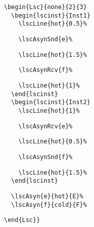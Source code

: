 \documentclass{article}
\begin{document}
\begin{center}%
\begin{minipage}{0.45\textwidth}%
\end{minipage}%
\hfill%
\begin{minipage}{0.33\textwidth}%
\small%
{\gray\begin{verbatim}
\begin{Lsc}{none}{2}{3}
  \begin{lscinst}{Inst1}
    \lscLine{hot}{0.5}%
\end{verbatim}}%
\verbunskip%
{\begin{verbatim}
    \lscAsynSnd{e}%
\end{verbatim}}%
\verbunskip%
{\gray\begin{verbatim}
    \lscLine{hot}{1.5}%
\end{verbatim}}%
\verbunskip%
{\begin{verbatim}
    \lscAsynRcv{f}%
\end{verbatim}}%
\verbunskip%
{\gray\begin{verbatim}
    \lscLine{hot}{1}%
  \end{lscinst}
  \begin{lscinst}{Inst2}
    \lscLine{hot}{1}%
\end{verbatim}}%
\verbunskip%
{\begin{verbatim}
    \lscAsynRcv{e}%
\end{verbatim}}%
\verbunskip%
{\gray\begin{verbatim}
    \lscLine{hot}{0.5}%
\end{verbatim}}%
\verbunskip%
{\begin{verbatim}
    \lscAsynSnd{f}%
\end{verbatim}}%
\verbunskip%
{\gray\begin{verbatim}
    \lscLine{hot}{1.5}%
  \end{lscinst}
\end{verbatim}}%
\verbunskip%
{\begin{verbatim}
  \lscAsyn{e}{hot}{E}%
  \lscAsyn{f}{cold}{F}%
\end{verbatim}}%
\verbunskip%
{\gray\begin{verbatim}
\end{Lsc}}
\end{verbatim}}%
\end{minipage}
\end{center}%
\end{document}

